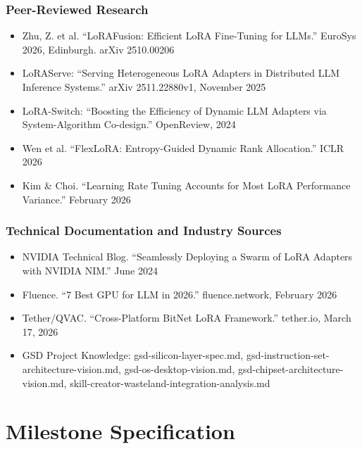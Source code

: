 \documentclass[11pt,letterpaper]{article}
\newcommand{\stageheader}[2]{%
  \noindent\colorbox{#2}{\makebox[\textwidth][l]{%
    \textcolor{white}{\bfseries\sffamily\hspace{6pt}#1\hspace{6pt}}}}%
  \vspace{0.5em}\par%
}
\begin{document}
\subsubsection{Peer-Reviewed Research}
\begin{itemize}
  \item Zhu, Z. et al. ``LoRAFusion: Efficient LoRA Fine-Tuning for LLMs.'' EuroSys 2026, Edinburgh. arXiv 2510.00206
  \item LoRAServe: ``Serving Heterogeneous LoRA Adapters in Distributed LLM Inference Systems.'' arXiv 2511.22880v1, November 2025
  \item LoRA-Switch: ``Boosting the Efficiency of Dynamic LLM Adapters via System-Algorithm Co-design.'' OpenReview, 2024
  \item Wen et al. ``FlexLoRA: Entropy-Guided Dynamic Rank Allocation.'' ICLR 2026
  \item Kim \& Choi. ``Learning Rate Tuning Accounts for Most LoRA Performance Variance.'' February 2026
\end{itemize}

\subsubsection{Technical Documentation and Industry Sources}
\begin{itemize}
  \item NVIDIA Technical Blog. ``Seamlessly Deploying a Swarm of LoRA Adapters with NVIDIA NIM.'' June 2024
  \item Fluence. ``7 Best GPU for LLM in 2026.'' fluence.network, February 2026
  \item Tether/QVAC. ``Cross-Platform BitNet LoRA Framework.'' tether.io, March 17, 2026
  \item GSD Project Knowledge: gsd-silicon-layer-spec.md, gsd-instruction-set-architecture-vision.md, gsd-os-desktop-vision.md, gsd-chipset-architecture-vision.md, skill-creator-wasteland-integration-analysis.md
\end{itemize}

\newpage

\stageheader{STAGE 3 --- MISSION PACKAGE}{tertiary}

\section{Milestone Specification}
\end{document}
